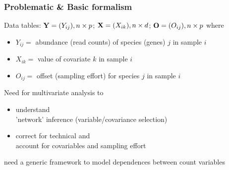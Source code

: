 \documentclass[10pt, c, xcolor=x11names]{beamer}\usepackage[]{graphicx}\usepackage[]{color}
\begin{document}
\begin{frame}
  \frametitle{Problematic \& Basic formalism}
  
  \begin{block}{Data tables: $\mathbf{Y} = (Y_{ij}), n \times p$;  $\mathbf{X} = (X_{ik}), n \times d$; $\mathbf{O} = (O_{ij}), n \times p$ where}
    \vspace{-.25cm}
    \begin{itemize}
    \item $Y_{ij} = $ abundance (read counts) of species (genes) $j$ in sample $i$
    \item $X_{ik} = $ value of covariate $k$ in sample $i$
    \item $O_{ij} = $ offset (sampling effort) for species $j$ in sample $i$
    \end{itemize}
  \end{block}

  \vfill

  \begin{block}{Need for multivariate analysis to}
    \vspace{-.25cm}
    \begin{itemize}
    \item understand  \\
      \rsa 'network' inference (variable/covariance selection)
    \item correct for technical and  \\
      \rsa account for covariables and sampling effort
    \end{itemize}
  \end{block}

  \rsa need a generic framework to \alert{model dependences between count variables}

\end{frame}

\end{document}

